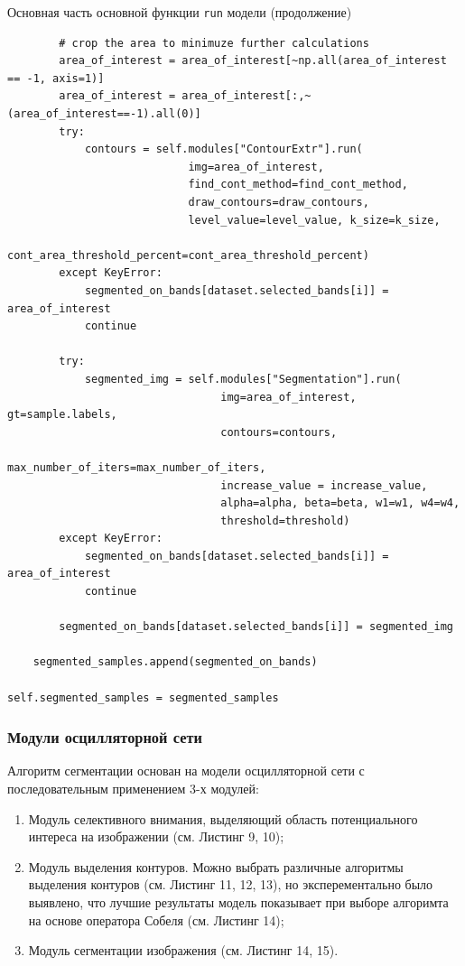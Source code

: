 \documentclass[14pt, russian]{scrartcl}
\begin{document}
\begin{listing}[H]
    \caption{Основная часть основной функции \texttt{run} модели (продолжение)}
    \label{lst:model_run}
    \begin{verbatim}
        # crop the area to minimuze further calculations
        area_of_interest = area_of_interest[~np.all(area_of_interest == -1, axis=1)]
        area_of_interest = area_of_interest[:,~(area_of_interest==-1).all(0)]
        try:
            contours = self.modules["ContourExtr"].run(
                            img=area_of_interest, 
                            find_cont_method=find_cont_method, 
                            draw_contours=draw_contours,
                            level_value=level_value, k_size=k_size,
                            cont_area_threshold_percent=cont_area_threshold_percent)
        except KeyError:
            segmented_on_bands[dataset.selected_bands[i]] = area_of_interest
            continue

        try:
            segmented_img = self.modules["Segmentation"].run(
                                 img=area_of_interest, gt=sample.labels,
                                 contours=contours,
                                 max_number_of_iters=max_number_of_iters,
                                 increase_value = increase_value,
                                 alpha=alpha, beta=beta, w1=w1, w4=w4,
                                 threshold=threshold)
        except KeyError:
            segmented_on_bands[dataset.selected_bands[i]] = area_of_interest
            continue

        segmented_on_bands[dataset.selected_bands[i]] = segmented_img

    segmented_samples.append(segmented_on_bands)

self.segmented_samples = segmented_samples
    \end{verbatim}
\end{listing}
\subsubsection{Модули осцилляторной сети}\label{subsect::onn_modules}

Алгоритм сегментации основан на модели осцилляторной сети с последовательным применением 3-х модулей:
\begin{enumerate}
    \item Модуль селективного внимания, выделяющий область потенциального интереса на изображении (см. Листинг 9, 10);
    \item Модуль выделения контуров. Можно выбрать различные алгоритмы выделения контуров (см. Листинг 11, 12, 13), но эксперементально было выявлено, что лучшие результаты модель показывает при выборе алгоримта на основе оператора Собеля (см. Листинг 14);
    \item Модуль сегментации изображения (см. Листинг 14, 15).
\end{enumerate}
\end{document}
